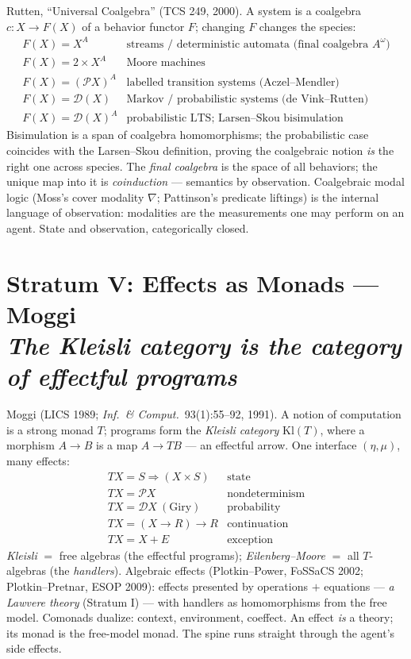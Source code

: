 \documentclass[11pt]{article}
\theoremstyle{plain}
\theoremstyle{definition}
\theoremstyle{remark}
\newcommand{\Kl}{\mathrm{Kl}}
\newcommand{\pow}{\mathcal{P}}
\newcommand{\stratum}[2]{\section{#1\\ {\normalsize\normalfont\itshape #2}}}
\begin{document}
Rutten, ``Universal Coalgebra'' (TCS 249, 2000). A system is a coalgebra $c\colon X \to F(X)$ of a behavior functor $F$; changing $F$ changes the species:
\[
\begin{array}{ll}
F(X)=X^{A} & \text{streams / deterministic automata (final coalgebra } A^{\omega}) \\
F(X)=2\times X^{A} & \text{Moore machines} \\
F(X)=(\pow X)^{A} & \text{labelled transition systems (Aczel--Mendler)} \\
F(X)=\mathcal{D}(X) & \text{Markov / probabilistic systems (de Vink--Rutten)} \\
F(X)=\mathcal{D}(X)^{A} & \text{probabilistic LTS; Larsen--Skou bisimulation}
\end{array}
\]
Bisimulation is a span of coalgebra homomorphisms; the probabilistic case coincides with the Larsen--Skou definition, proving the coalgebraic notion \emph{is} the right one across species. The \emph{final coalgebra} is the space of all behaviors; the unique map into it is \emph{coinduction} --- semantics by observation. Coalgebraic modal logic (Moss's cover modality $\nabla$; Pattinson's predicate liftings) is the internal language of observation: modalities are the measurements one may perform on an agent. State and observation, categorically closed.

\stratum{Stratum V: Effects as Monads --- Moggi}{The Kleisli category is the category of effectful programs}

Moggi (LICS 1989; \emph{Inf.\ \& Comput.}\ 93(1):55--92, 1991). A notion of computation is a strong monad $T$; programs form the \emph{Kleisli category} $\Kl(T)$, where a morphism $A \to B$ is a map $A \to TB$ --- an effectful arrow. One interface $(\eta,\mu)$, many effects:
\[
\begin{array}{ll}
TX = S \Rightarrow (X\times S) & \text{state} \\
TX = \pow X & \text{nondeterminism} \\
TX = \mathcal{D}X\ (\text{Giry}) & \text{probability} \\
TX = (X\to R)\to R & \text{continuation} \\
TX = X + E & \text{exception}
\end{array}
\]
\emph{Kleisli} $=$ free algebras (the effectful programs); \emph{Eilenberg--Moore} $=$ all $T$-algebras (the \emph{handlers}). Algebraic effects (Plotkin--Power, FoSSaCS 2002; Plotkin--Pretnar, ESOP 2009): effects presented by operations $+$ equations --- \emph{a Lawvere theory} (Stratum I) --- with handlers as homomorphisms from the free model. Comonads dualize: context, environment, coeffect. An effect \emph{is} a theory; its monad is the free-model monad. The spine runs straight through the agent's side effects.
\end{document}
